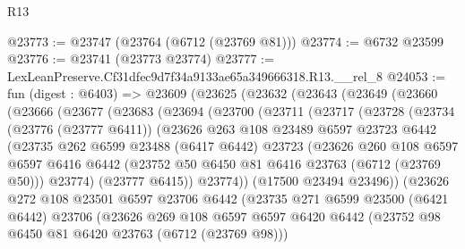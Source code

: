 \begin{lexlean}{R13}
\begin{coremodule}
@23773 := @23747 (@23764 (@6712 (@23769 @81)))
@23774 := @6732 @23599
@23776 := @23741 (@23773 @23774)
@23777 := LexLeanPreserve.Cf31dfec9d7f34a9133ae65a349666318.R13.__rel_8
@24053 := fun (digest : @6403) =>
  @23609
    (@23625
      (@23632
        (@23643
          (@23649
            (@23660
              (@23666
                (@23677
                  (@23683
                    (@23694
                      (@23700
                        (@23711
                          (@23717
                            (@23728
                              (@23734
                                (@23776 (@23777 @6411))
                                (@23626
                                  @263
                                  @108
                                  @23489
                                  @6597
                                  @23723
                                  @6442
                                  (@23735
                                    @262
                                    @6599
                                    @23488
                                    (@6417 @6442)
                                    @23723
                                    (@23626
                                      @260
                                      @108
                                      @6597
                                      @6597
                                      @6416
                                      @6442
                                      (@23752 @50 @6450 @81 @6416 @23763 (@6712 (@23769 @50)))
                                      @23774)
                                    (@23777 @6415))
                                  @23774))
                              (@17500 @23494 @23496))
                            (@23626
                              @272
                              @108
                              @23501
                              @6597
                              @23706
                              @6442
                              (@23735
                                @271
                                @6599
                                @23500
                                (@6421 @6442)
                                @23706
                                (@23626
                                  @269
                                  @108
                                  @6597
                                  @6597
                                  @6420
                                  @6442
                                  (@23752 @98 @6450 @81 @6420 @23763 (@6712 (@23769 @98)))

\end{coremodule}
\end{lexlean}
